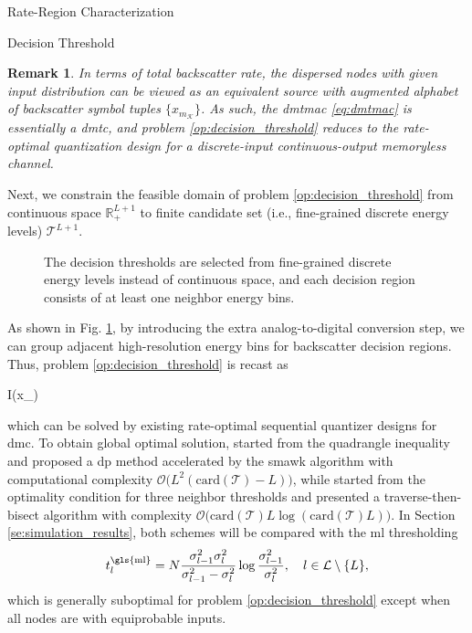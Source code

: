 \documentclass[journal]{IEEEtran}
\newtheorem{remark}{Remark}
\begin{document}
\begin{section}{Rate-Region Characterization}
\begin{subsection}{Decision Threshold}
		\begin{remark}
			In terms of total backscatter rate, the dispersed nodes with given input distribution can be viewed as an equivalent source with augmented alphabet of backscatter symbol tuples $\{x_{m_{\mathcal{K}}}\}$.
			As such, the \gls{dmtmac} \eqref{eq:dmtmac} is essentially a \gls{dmtc}, and problem \eqref{op:decision_threshold} reduces to the rate-optimal quantization design for a discrete-input continuous-output memoryless channel.
			\label{re:augmented_source}
		\end{remark}

		Next, we constrain the feasible domain of problem \eqref{op:decision_threshold} from continuous space $\mathbb{R}_+^{L+1}$ to finite candidate set (i.e., fine-grained discrete energy levels) $\mathcal{T}^{L+1}$.
		\begin{figure}[!t]
			\centering
			\resizebox{0.9\columnwidth}{!}{
				
			}
			\caption{The decision thresholds are selected from fine-grained discrete energy levels instead of continuous space, and each decision region consists of at least one neighbor energy bins.}
			\label{fi:discrete_outputs}
		\end{figure}
		As shown in Fig. \ref{fi:discrete_outputs}, by introducing the extra analog-to-digital conversion step, we can group adjacent high-resolution energy bins for backscatter decision regions.
		Thus, problem \eqref{op:decision_threshold} is recast as
		\begin{maxi!}
			{}{I(x_{})}{\label{op:decision_threshold_discrete}}{\label{ob:decision_threshold_discrete}}
			\addConstraint{\eqref{co:sequential_threshold},}
		\end{maxi!}
		which can be solved by existing rate-optimal sequential quantizer designs for \gls{dmc}.
		To obtain global optimal solution, \cite{He2021} started from the quadrangle inequality and proposed a \gls{dp} method accelerated by the \gls{smawk} algorithm with computational complexity $\mathcal{O}\bigl(L^2(\mathrm{card}(\mathcal{T})-L)\bigr)$, while \cite{Nguyen2020a} started from the optimality condition for three neighbor thresholds and presented a traverse-then-bisect algorithm with complexity $\mathcal{O}\bigl(\mathrm{card}(\mathcal{T})L\log(\mathrm{card}(\mathcal{T})L)\bigr)$.
		In Section \ref{se:simulation_results}, both schemes will be compared with the \gls{ml} thresholding \cite{Qian2019}
		\begin{equation}
			t_{l}^{\mathrm{\gls{ml}}} = N \frac{\sigma_{l-1}^2 \sigma_{l}^2}{\sigma_{l-1}^2 - \sigma_{l}^2} \log \frac{\sigma_{l-1}^2}{\sigma_{l}^2}, \quad l \in \mathcal{L} \setminus \{L\},
			\label{eq:detection_threshold_maximum_likelihood}
		\end{equation}
		which is generally suboptimal for problem \eqref{op:decision_threshold} except when all nodes are with equiprobable inputs.
	\end{subsection}
\end{section}
\end{document}
